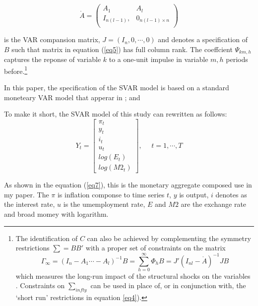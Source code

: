 \documentclass[11pt,letterpaper]{article}
\begin{document}
	\begin{equation}\label{eq6}
	\mathring{A} = \begin{pmatrix}
			A_{1} & A_{l}   \\
			I_{n(l-1)},& 0_{n(l-1)\times n} \\
		\end{pmatrix}
	\end{equation}

	\noindent is the VAR compansion matrix, $J =(I_{n}, 0, \cdots, 0)$ and  denotes a specification of $B$ such that matrix in equation (\ref{eq5}) has full column rank. The coeffcient $\Psi_{km,h}$ captures the reponse of variable $k$ to a one-unit impulse in variable $m,h$ periods before.\footnote{The identification of $C$ can also be achieved by complementing the symmetry restrictions $\sum=BB'$ with a proper set of constraints on the matrix 
	\begin{equation*}
	\Gamma_{\infty} = (I_{n}-A_{1} \cdots - A_{l})^{-1}B = \sum_{h=0}^{\infty}\Phi_{h}B = J'(I_{nl}-\mathring{A})^{-1}JB 
	\end{equation*}
	\noindent which measures the long-run impact of the structural shocks on the variables \cite{Blanchard1989}. Constraints
	on $\sum_{infty}$ can be used in place of, or in conjunction with, the ‘short run’ restrictions in equation \ref{eq4}).
}

	In this paper, the specification of the SVAR model is based on a standard moneteary VAR model that apperar in \citet{ Bacchiocchi2015, Christiano2005, Christiano1999, Stock2001}; and \citet{Uhlig2005}
	
	To make it short, the SVAR model of this study can rewritten as follows: 
		\begin{equation}\label{eq7}
		 	Y_{t} =\begin{bmatrix} 
			\pi_{t} \\
			y_{t} \\
			i_{t}\\
			u_{t} \\
			log(E_{t}) \\
			log(M2_{t})
		\end{bmatrix}, \:\:\:\:\:\: t = 1, \cdots, T
	\end{equation}
	
	As shown in the equation (\ref{eq7}), this is the monetary aggregate composed use in my paper. The $\pi$ is inflation componse to time series $t$, $y$ is output, $i$ denotes as the interest rate, $u$ is the umemployment rate, $E$ and $M2$ are the exchange rate and broad momey with logarithm.  
\end{document}
